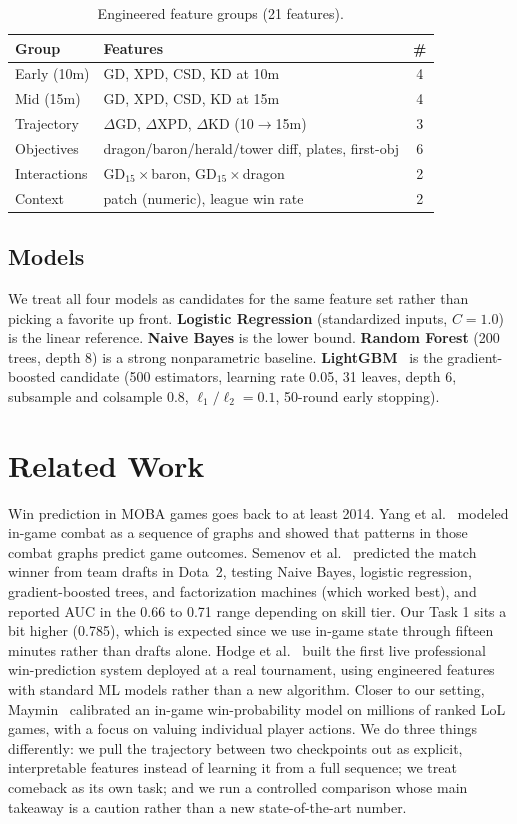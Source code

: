 \documentclass[sigconf,nonacm]{acmart}
\newcommand{\D}{\Delta}
\begin{document}
\begin{table}[t]
\caption{Engineered feature groups (21 features).}
\label{tab:features}
\begin{tabular}{@{}llc@{}}
\toprule
Group & Features & \# \\
\midrule
Early (10m)  & GD, XPD, CSD, KD at 10m & 4 \\
Mid (15m)    & GD, XPD, CSD, KD at 15m & 4 \\
Trajectory   & $\D$GD, $\D$XPD, $\D$KD (10$\to$15m) & 3 \\
Objectives   & dragon/baron/herald/tower diff, plates, first-obj & 6 \\
Interactions & GD$_{15}\!\times\!$baron, GD$_{15}\!\times\!$dragon & 2 \\
Context      & patch (numeric), league win rate & 2 \\
\bottomrule
\end{tabular}
\end{table}

\subsection{Models}
We treat all four models as candidates for the same feature set rather than picking a favorite up
front. \textbf{Logistic Regression} (standardized inputs, $C{=}1.0$) is the linear reference.
\textbf{Naive Bayes} is the lower bound. \textbf{Random Forest} (200 trees, depth 8) is a strong
nonparametric baseline. \textbf{LightGBM}~\cite{lightgbm} is the gradient-boosted candidate
(500 estimators, learning rate 0.05, 31 leaves, depth 6, subsample and colsample 0.8,
$\ell_1/\ell_2{=}0.1$, 50-round early stopping).

\section{Related Work}
Win prediction in MOBA games goes back to at least 2014. Yang et al.~\cite{yang2014} modeled
in-game combat as a sequence of graphs and showed that patterns in those combat graphs predict
game outcomes. Semenov et al.~\cite{semenov2016} predicted the match winner from team drafts in
Dota~2, testing Naive Bayes, logistic regression, gradient-boosted trees, and factorization
machines (which worked best), and reported AUC in the 0.66 to 0.71 range depending on skill tier.
Our Task 1 sits a bit higher (0.785), which is expected since we use in-game state through fifteen
minutes rather than drafts alone. Hodge et al.~\cite{hodge2019} built the first live professional
win-prediction system deployed at a real tournament, using engineered features with standard ML
models rather than a new algorithm. Closer to our setting, Maymin~\cite{maymin2021} calibrated an
in-game win-probability model on millions of ranked LoL games, with a focus on valuing individual
player actions. We do
three things differently: we pull the trajectory between two checkpoints out as explicit,
interpretable features instead of learning it from a full sequence; we treat comeback as its own
task; and we run a controlled comparison whose main takeaway is a caution rather than a new
state-of-the-art number.
\end{document}

